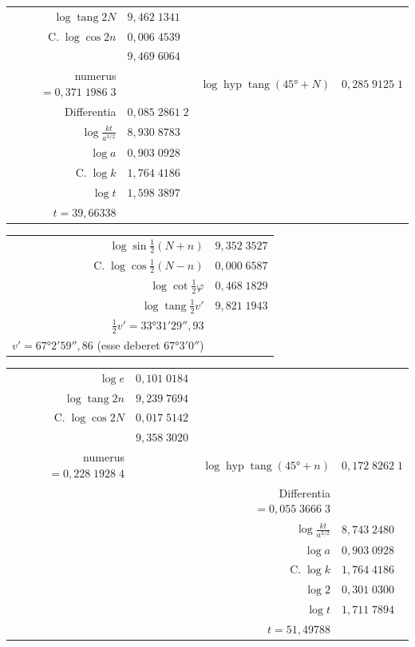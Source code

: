 \documentclass[12pt,a4paper]{article}
\newcommand{\tang}{\mathop{\mathrm{tang}}\nolimits}
\newcommand{\C}{\mathop{\mathrm{C.}}\nolimits}
\DeclareMathOperator{\hyp}{hyp}
\begin{document}
\begin{center}
\begin{tabular}{@{}r@{\quad}l@{\qquad}r@{\quad}l@{}}
$\log\tang 2N$ & $9{,}462\;1341$ & & \\
$\C\log\cos 2n$ & $0{,}006\;4539$ & & \\ \hline
& $9{,}469\;6064$ & & \\
numerus $= 0{,}371\;1986\;3$ & & $\log\hyp\tang(45° + N)$ & $0{,}285\;9125\;1$ \\
Differentia & $0{,}085\;2861\;2$ & & \\
$\log\tfrac{kt}{a^{3/2}}$ & $8{,}930\;8783$ & & \\
$\log a$ & $0{,}903\;0928$ & & \\
$\C\log k$ & $1{,}764\;4186$ & & \\
$\log t$ & \multicolumn{3}{l}{$1{,}598\;3897$} \\
$t = 39{,}66338$ & &
\end{tabular}
\end{center}

\begin{center}
\begin{tabular}{@{}r@{\quad}l@{}}
$\log\sin\tfrac{1}{2}(N + n)$ & $9{,}352\;3527$ \\
$\C\log\cos\tfrac{1}{2}(N - n)$ & $0{,}000\;6587$ \\
$\log\cot\tfrac{1}{2}\varphi$ & $0{,}468\;1829$ \\ \hline
$\log\tang\tfrac{1}{2}v'$ & $9{,}821\;1943$ \\
$\tfrac{1}{2}v' = 33°31'29'',93$ & \\
$v' = 67°2'59'',86$ (esse deberet $67°3'0''$) &
\end{tabular}
\end{center}

\begin{center}
\begin{tabular}{@{}r@{\quad}l@{\qquad}r@{\quad}l@{}}
$\log e$ & $0{,}101\;0184$ & & \\
$\log\tang 2n$ & $9{,}239\;7694$ & & \\
$\C\log\cos 2N$ & $0{,}017\;5142$ \\ \hline
& $9{,}358\;3020$ & & \\
numerus $= 0{,}228\;1928\;4$ & & $\log\hyp\tang(45° + n)$ & $0{,}172\;8262\;1$ \\
& & Differentia $= 0{,}055\;3666\;3$ & \\
& & $\log\tfrac{kt}{a^{3/2}}$ & $8{,}743\;2480$ \\
& & $\log a$ & $0{,}903\;0928$ \\
& & $\C\log k$ & $1{,}764\;4186$ \\
& & $\log 2$ & $0{,}301\;0300$ \\ \hline
& & $\log t$ & $1{,}711\;7894$ \\
& & $t = 51{,}49788$ &
\end{tabular}
\end{center}
\end{document}
